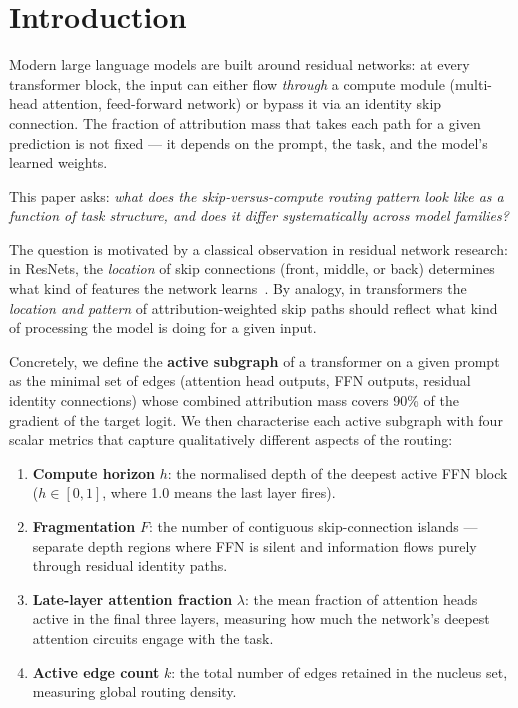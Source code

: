 \documentclass{article}
\begin{document}
\section{Introduction}

Modern large language models are built around residual networks: at
every transformer block, the input can either flow \emph{through} a
compute module (multi-head attention, feed-forward network) or bypass
it via an identity skip connection.
The fraction of attribution mass that takes each path for a given
prediction is not fixed — it depends on the prompt, the task, and the
model's learned weights.

This paper asks: \emph{what does the skip-versus-compute routing pattern
look like as a function of task structure, and does it differ
systematically across model families?}

The question is motivated by a classical observation in residual
network research: in ResNets, the \emph{location} of skip connections
(front, middle, or back) determines what kind of features the
network learns~\citep{veit2016residual,greff2017highway}.
By analogy, in transformers the \emph{location and pattern} of
attribution-weighted skip paths should reflect what kind of processing
the model is doing for a given input.

Concretely, we define the \textbf{active subgraph} of a transformer on
a given prompt as the minimal set of edges (attention head outputs,
FFN outputs, residual identity connections) whose combined attribution
mass covers 90\% of the gradient of the target logit.
We then characterise each active subgraph with four scalar metrics that
capture qualitatively different aspects of the routing:

\begin{enumerate}
  \item \textbf{Compute horizon} $h$: the normalised depth of the deepest
    active FFN block ($h \in [0,1]$, where 1.0 means the last layer fires).
  \item \textbf{Fragmentation} $F$: the number of contiguous
    skip-connection islands — separate depth regions where FFN is silent
    and information flows purely through residual identity paths.
  \item \textbf{Late-layer attention fraction} $\lambda$: the mean
    fraction of attention heads active in the final three layers,
    measuring how much the network's deepest attention circuits
    engage with the task.
  \item \textbf{Active edge count} $k$: the total number of edges
    retained in the nucleus set, measuring global routing density.
\end{enumerate}
\end{document}
